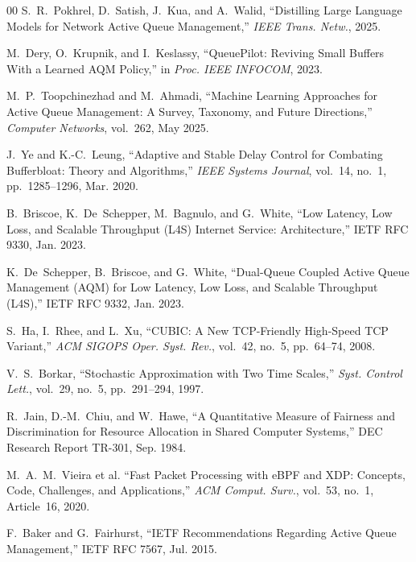 \documentclass[conference]{IEEEtran}
\begin{document}
\begin{thebibliography}{00}
S.~R.~Pokhrel, D.~Satish, J.~Kua, and A.~Walid, ``Distilling Large Language
Models for Network Active Queue Management,'' \textit{IEEE Trans. Netw.},
2025.

M.~Dery, O.~Krupnik, and I.~Keslassy, ``QueuePilot: Reviving Small Buffers With
a Learned AQM Policy,'' in \textit{Proc. IEEE INFOCOM}, 2023.

M.~P.~Toopchinezhad and M.~Ahmadi, ``Machine Learning Approaches for Active
Queue Management: A Survey, Taxonomy, and Future Directions,''
\textit{Computer Networks}, vol.~262, May 2025.

J.~Ye and K.-C.~Leung, ``Adaptive and Stable Delay Control for Combating
Bufferbloat: Theory and Algorithms,'' \textit{IEEE Systems Journal}, vol.~14,
no.~1, pp.~1285--1296, Mar. 2020.

B.~Briscoe, K.~De~Schepper, M.~Bagnulo, and G.~White, ``Low Latency, Low Loss,
and Scalable Throughput (L4S) Internet Service: Architecture,'' IETF RFC 9330,
Jan. 2023.

K.~De~Schepper, B.~Briscoe, and G.~White, ``Dual-Queue Coupled Active Queue
Management (AQM) for Low Latency, Low Loss, and Scalable Throughput (L4S),''
IETF RFC 9332, Jan. 2023.

S.~Ha, I.~Rhee, and L.~Xu, ``CUBIC: A New TCP-Friendly High-Speed TCP
Variant,'' \textit{ACM SIGOPS Oper. Syst. Rev.}, vol.~42, no.~5, pp.~64--74,
2008.

V.~S.~Borkar, ``Stochastic Approximation with Two Time Scales,''
\textit{Syst. Control Lett.}, vol.~29, no.~5, pp.~291--294, 1997.

R.~Jain, D.-M.~Chiu, and W.~Hawe, ``A Quantitative Measure of Fairness and
Discrimination for Resource Allocation in Shared Computer Systems,'' DEC
Research Report TR-301, Sep. 1984.

M.~A.~M.~Vieira et al. ``Fast Packet Processing with eBPF and XDP: Concepts,
Code, Challenges, and Applications,'' \textit{ACM Comput. Surv.}, vol.~53,
no.~1, Article~16, 2020.

F.~Baker and G.~Fairhurst, ``IETF Recommendations Regarding Active Queue
Management,'' IETF RFC 7567, Jul. 2015.

\end{thebibliography}
\end{document}
